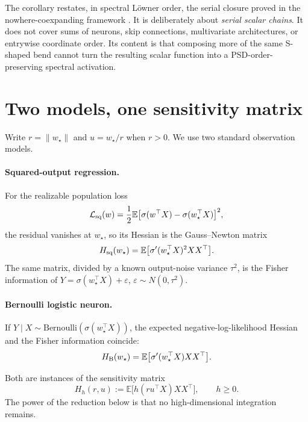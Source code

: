 \documentclass[11pt]{article}
\newcommand{\E}{\mathbb E}
\begin{document}
The corollary restates, in spectral L\"owner order, the serial closure proved in the nowhere-coexpanding framework
\cite{cook2023}.  It is deliberately about \emph{serial scalar chains}.  It does not cover sums of neurons, skip
connections, multivariate architectures, or entrywise coordinate order.  Its content is that composing more of the
same S-shaped bend cannot turn the resulting scalar function into a PSD-order-preserving spectral activation.

\section{Two models, one sensitivity matrix}

Write $r=\lVert w_\star\rVert$ and $u=w_\star/r$ when $r>0$.  We use two standard observation models.

\paragraph{Squared-output regression.}
For the realizable population loss
\begin{equation}
 \mathcal L_{\rm sq}(w)=\frac12\E\bigl[\sigma(w^\top X)-\sigma(w_\star^\top X)\bigr]^2,
 \label{eq:squareloss}
\end{equation}
the residual vanishes at $w_\star$, so its Hessian is the Gauss--Newton matrix
\begin{equation}
 H_{\rm sq}(w_\star)=\E\bigl[\sigma'(w_\star^\top X)^2XX^\top\bigr].
 \label{eq:squarehess}
\end{equation}
The same matrix, divided by a known output-noise variance $\tau^2$, is the Fisher information of
$Y=\sigma(w_\star^\top X)+\varepsilon$, $\varepsilon\sim N(0,\tau^2)$.

\paragraph{Bernoulli logistic neuron.}
If $Y\mid X\sim\mathrm{Bernoulli}(\sigma(w_\star^\top X))$, the expected negative-log-likelihood Hessian and the
Fisher information coincide:
\begin{equation}
 H_{\rm B}(w_\star)=\E\bigl[\sigma'(w_\star^\top X)XX^\top\bigr].
 \label{eq:bernhess}
\end{equation}

Both are instances of the sensitivity matrix
\begin{equation}
 H_h(r,u):=\E\bigl[h(r u^\top X)XX^\top\bigr], \qquad h\ge0.
 \label{eq:profilematrix}
\end{equation}
The power of the reduction below is that no high-dimensional integration remains.
\end{document}
